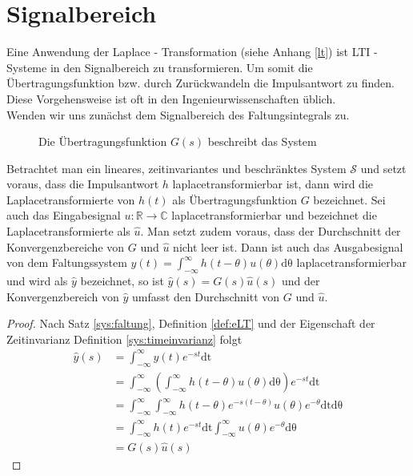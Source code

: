 \section{Signalbereich}
Eine Anwendung der Laplace - Transformation (siehe Anhang \ref{lt}) ist LTI - Systeme in den Signalbereich zu transformieren. Um somit die Übertragungsfunktion bzw. durch Zurückwandeln die Impulsantwort zu finden. Diese Vorgehensweise ist oft in den Ingenieurwissenschaften üblich. \\
Wenden wir uns zunächst dem Signalbereich des Faltungsintegrals zu.
\begin{figure}
	\centering
	\def\svgwidth{0.75\columnwidth}
	
	\caption{Die Übertragungsfunktion $G(s)$ beschreibt das System}
	\label{fig:faltung}
\end{figure}
\begin{satz}  \label{s:transfer}
Betrachtet man ein lineares, zeitinvariantes und beschränktes System $\mathscr{S}$ und setzt voraus, dass die Impulsantwort $h$ laplacetransformierbar ist, dann wird die Laplacetransformierte von $h(t)$ als Übertragungsfunktion $G$ bezeichnet. Sei auch das Eingabesignal $u: \mathbb{R} \rightarrow \mathbb{C}$ laplacetransformierbar und bezeichnet die Laplacetransformierte als $\hat{u}$. Man setzt zudem voraus, dass der Durchschnitt der Konvergenzbereiche von $G$ und $\hat{u}$ nicht leer ist. Dann ist auch das Ausgabesignal von dem Faltungssystem $y(t) = \int_{-\infty}^{\infty} h(t-\theta) u(\theta) \mathrm{d\theta}$ laplacetransformierbar und wird als $\hat{y}$ bezeichnet, so ist $\hat{y}(s) = G(s)\hat{u}(s)$ und der Konvergenzbereich von $\hat{y}$ umfasst den Durchschnitt von $G$ und $\hat{u}$.
\begin{proof}
Nach Satz \ref{sys:faltung}, Definition \ref{def:eLT} und der Eigenschaft der Zeitinvarianz Definition \ref{sys:timeinvarianz} folgt
\begin{align}
\hat{y}(s) &= \int_{-\infty}^{\infty} y(t) e^{-st} \mathrm{dt}\\
&= \int_{-\infty}^{\infty} \left(\int_{-\infty}^{\infty} h(t-\theta) u(\theta) \mathrm{d\theta} \right) e^{-st} \mathrm{dt}\\
&= \int_{-\infty}^{\infty} \int_{-\infty}^{\infty} h(t-\theta) e^{-s(t-\theta)} u(\theta) e^{-\theta} \mathrm{dt} \mathrm{d\theta} \\
&= \int_{-\infty}^{\infty} h(t) e^{-st} \mathrm{dt} \int_{-\infty}^{\infty} u(\theta) e^{-\theta}\mathrm{d\theta} \\
&= G(s) \hat{u}(s)
\end{align} 
\end{proof}
\end{satz}
